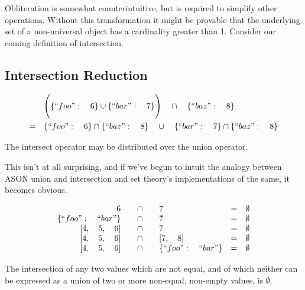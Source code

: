\documentclass[letterpaper]{article}
\begin{document}
Obliteration is somewhat counterintuitive, but is required to simplify other
operations. Without this transformation it might be provable that the
underlying set of a non-universal object has a cardinality greater than 1.
Consider our coming definition of intersection.

\subsection{Intersection Reduction}

\begin{prule}
\label{sec:interdist}
\begin{equation}
\begin{split}
& \Bigg( \{``foo":\quad6\} \cup \{``bar":\quad7\} \Bigg) \quad \cap \quad
\{``baz":\quad8\} \\
= \quad& \{``foo":\quad6\} \cap \{``baz":\quad8\} \quad \cup \quad \{``bar":\quad7\}
 \cap \{``baz":\quad8\}
\end{split}
\end{equation}

The intersect operator may be distributed over the union operator.
\end{prule}

This isn't at all surprising, and if we've begun to intuit the analogy between
ASON union and intersection and set theory's implementations of the same, it
becomes obvious.

\begin{prule}
\label{sec:interelim}
\begin{equation}
\begin{array}{rclcl}
6 \quad&\cap&\quad 7 & = & \emptyset \\
\{``foo":\quad``bar"\} \quad&\cap&\quad 7 & = & \emptyset \\
{[}4,\quad5,\quad6] \quad&\cap&\quad 7 & = & \emptyset \\
{[}4,\quad5,\quad6] \quad&\cap&\quad {[}7,\quad8] & = & \emptyset \\
{[}4,\quad5,\quad6] \quad&\cap&\quad \{``foo":\quad``bar"\} & = & \emptyset \\
\end{array}
\end{equation}

The intersection of any two values which are not equal, and of which neither
can be expressed as a union of two or more non-equal, non-empty values, is
\(\emptyset\).
\end{prule}
\end{document}
